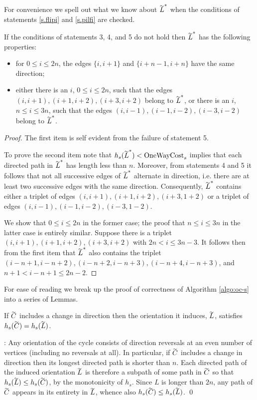 For convenience we spell out what we know about $\tildeb{L}^*$ when the conditions of statements
\ref{s.flipi} and \ref{s.pilfi} are checked.
\begin{lemma}\label{l.flipc}
	If the conditions of statements 3, 4, and 5 do not hold  then $\tildeb{L}^*$ has the following properties:
	\begin{itemize}
		\item for $0\leq i \leq 2n$, the edges $\{i,i+1\}$ and $\{i+n-1,i+n\}$ have the same direction;
		\item either there is an $i$, $0\leq i\leq 2n$, such that 
		the edges $(i,i+1),(i+1,i+2),(i+3,i+2)$ belong to $\tildeb{L}^*$, or
		there is an $i$, $n\leq i\leq 3n$, such that the edges 
		$(i,i-1),(i-1,i-2),(i-3,i-2)$ belong to $\tildeb{L}^*$. 
	\end{itemize}
\end{lemma}
\begin{proof}
	The first item is self evident from the failure of statement 5. 
	
	To prove the second item note 
	that $h_s(\tildeb{L}^*)<\mbox{OneWayCost}_s$ implies
	that each directed path in $\tildeb{L}^*$ has length less than $n$. Moreover, from
	statements 4 and 5 it follows that not all successive edges of $\tildeb{L}^*$ alternate in direction,
	i.e. there are at least two successive edges with the same direction. Consequently, 
	$\tildeb{L}^*$ contains either a triplet of edges $(i,i+1),(i+1,i+2),(i+3,1+2)$ or a triplet of edges 
	$(i,i-1),(i-1,i-2),(i-3,1-2)$. 
	
	We show that $0\leq i\leq 2n$ in the former case; the proof that $n\leq i\leq 3n$ in the latter case
	is entirely similar. Suppose there is a triplet $(i,i+1),(i+1,i+2),(i+3,i+2)$ with $2n< i \leq 3n-3$. 
	It follows then from the first item that $\tildeb{L}^*$ also contains the triplet $(i-n+1,i-n+2),(i-n+2,i-n+3),(i-n+4,i-n+3)$, and $n+1 < i-n+1 \leq 2n-2$.
	
	
\end{proof}

For ease of reading we break up the proof of correctness of Algorithm \ref{algo:oc-s} into a series of Lemmas. 

\begin{lemma}\label{l.cd}
	If $\tildeb{C}$ includes a change in direction then the orientation it induces,  $\tildeb{L}$, satisfies $h_s(\tildeb{C})= h_s(\tildeb{L})$.
\end{lemma}
:
Any orientation of the cycle consists of direction reversals at an even number of vertices 
(including no reversals at all). In particular, if $\tildeb{C}$  includes a change in direction 
then its longest directed path is
shorter than $n$. Each directed path of the induced orientation $\tildeb{L}$ is therefore a subpath 
of some path in $\tildeb{C}$ so that $h_s(\tildeb{L}) \leq h_s(\tildeb{C})$, 
by the monotonicity of $h_s$. 
Since $L$ is longer than $2n$, any path of $\tildeb{C}$ appears in its entirety in $\tildeb{L}$,
whence also $h_s(\tildeb{C})\leq h_s(\tildeb{L})$. 
\qed

